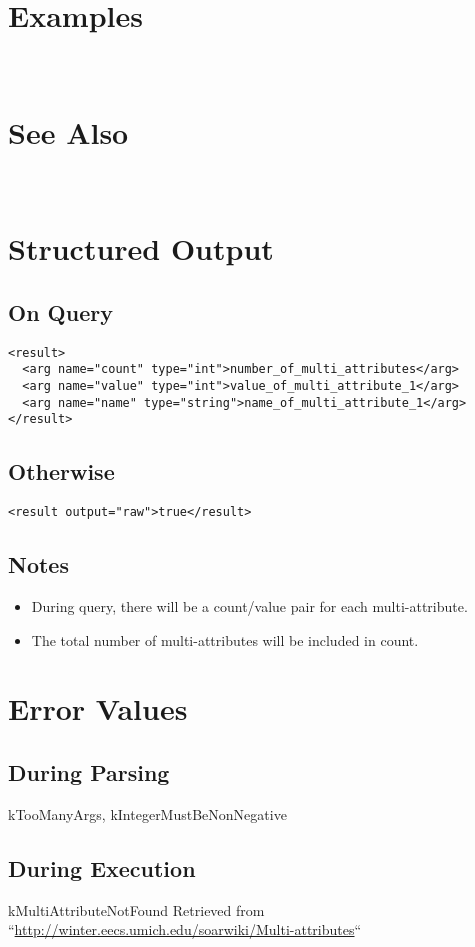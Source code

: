 \documentclass[10pt]{article}
\begin{document}
 \\ 

\section*{ Examples }


 \\ 

\section*{ See Also }


 \\ 

\section*{ Structured Output }
\subsection*{ On Query }
\begin{verbatim}
<result>
  <arg name="count" type="int">number_of_multi_attributes</arg>
  <arg name="value" type="int">value_of_multi_attribute_1</arg>
  <arg name="name" type="string">name_of_multi_attribute_1</arg>
</result>

\end{verbatim}
\subsection*{ Otherwise }
\begin{verbatim}
<result output="raw">true</result>

\end{verbatim}
\subsection*{ Notes }
\begin{itemize}
\item  During query, there will be a count/value pair for each multi-attribute. 
\item  The total number of multi-attributes will be included in count. 

\end{itemize}
\section*{ Error Values }
\subsection*{ During Parsing }


 kTooManyArgs, kIntegerMustBeNonNegative
\subsection*{ During Execution }


 kMultiAttributeNotFound Retrieved from ``\url{http://winter.eecs.umich.edu/soarwiki/Multi-attributes}``
\end{document}

